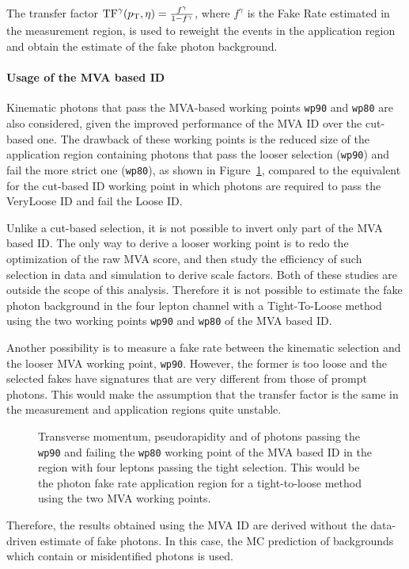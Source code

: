 The transfer factor
$\text{TF}^\gamma(p_{\mathrm{T}}, \eta) = \frac{f^\gamma}{1-f^\gamma}$,
where $f^\gamma$ is the Fake Rate estimated in the measurement region,
is used to reweight the events in the application region and obtain
the estimate of the fake photon background.

\paragraph{Usage of the MVA based ID\\}
Kinematic photons that pass the MVA-based working points \texttt{wp90} and \texttt{wp80} are also considered,
given the improved performance of the MVA ID over the cut-based one.
The drawback of these working points is the reduced size of the application region containing
photons that pass the looser selection (\texttt{wp90}) and fail the more strict one (\texttt{wp80}),
as shown in Figure~\ref{fig:SR4P_lead_90not80},
compared to the equivalent for the cut-based ID working point
in which photons are required to pass the VeryLoose ID and fail the Loose ID.

Unlike a cut-based selection, it is not possible to invert only part of the MVA based ID.
The only way to derive a looser working point is to redo the optimization of the raw MVA score,
and then study the efficiency of such selection in data and simulation to derive scale factors.
Both of these studies are outside the scope of this analysis.
Therefore it is not possible to estimate the fake photon background in the four lepton channel
with a Tight-To-Loose method using the two working points \texttt{wp90} and \texttt{wp80} of the MVA based ID.

Another possibility is to measure a fake rate between the kinematic selection and the looser MVA working point, \texttt{wp90}.
However, the former is too loose and the selected fakes have signatures that are very different from those of prompt photons.
This would make the assumption that the transfer factor is the same in the measurement and application regions quite unstable.

\begin{figure}
  \centering
  \caption{Transverse momentum, pseudorapidity and \sieie of photons
    passing the \texttt{wp90} and failing the \texttt{wp80} working point of the MVA based ID
    in the region with four leptons passing the tight selection.
    This would be the photon fake rate application region
    for a tight-to-loose method using the two MVA working points.
    }
  \label{fig:SR4P_lead_90not80}
\end{figure}

Therefore, the results obtained using the MVA ID are derived without the data-driven estimate of fake photons.
In this case, the MC prediction of backgrounds which contain \nonprompt or misidentified photons is used.

